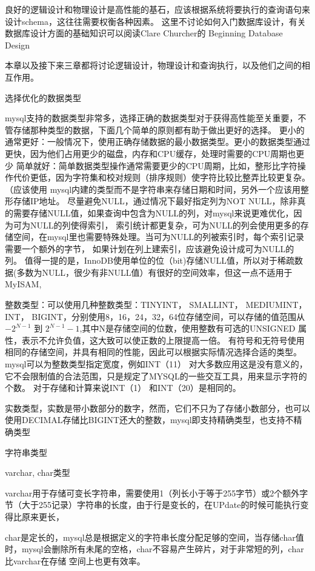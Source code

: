 
良好的逻辑设计和物理设计是高性能的基石，应该根据系统将要执行的查询语句来设计schema，这往往需要权衡各种因素。
这里不讨论如何入门数据库设计，有关数据库设计方面的基础知识可以阅读Clare Churcher的 Beginning Database Design

本章以及接下来三章都将讨论逻辑设计，物理设计和查询执行，以及他们之间的相互作用。

选择优化的数据类型

mysql支持的数据类型非常多，选择正确的数据类型对于获得高性能至关重要，不管存储那种类型的数据，下面几个简单的原则都有助于做出更好的选择。
更小的通常更好：一般情况下，使用正确存储数据的最小数据类型。更小的数据类型通过更快，因为他们占用更少的磁盘，内存和CPU缓存，处理时需要的CPU周期也更少
简单就好：简单数据类型操作通常需要更少的CPU周期，比如，整形比字符操作代价更低，因为字符集和校对规则（排序规则）使字符比较比整弄比较更复杂。（应该使用
mysql内建的类型而不是字符串来存储日期和时间，另外一个应该用整形存储IP地址。
尽量避免NULL，通过情况下最好指定列为NOT NULL，除非真的需要存储NULL值，如果查询中包含为NULL的列，对mysql来说更难优化，因为可为NULL的列使得索引，
索引统计都更复杂，可为NULL的列会使用更多的存储空间，在mysql里也需要特殊处理。当可为NULL的列被索引时，每个索引记录需要一个额外的字节，
如果计划在列上建索引，应该避免设计成可为NULL的列。
值得一提的是，InnoDB使用单位的位（bit)存储NULL值，所以对于稀疏数据(多数为NULL，很少有非NULL值）有很好的空间效率，但这一点不适用于MyISAM,

整数类型：可以使用几种整数类型：TINYINT， SMALLINT， MEDIUMINT， INT， BIGINT，分别使用8，16，24，32，64位存储空间，可以存储的值范围从$-2^{N-1}$ 到
$2^{N-1}-1$,其中N是存储空间的位数，使用整数有可选的UNSIGNED 属性，表示不允许负值，这大致可以使正数的上限提高一倍。
有符号和无符号使用相同的存储空间，并具有相同的性能，因此可以根据实际情况选择合适的类型。
mysql可以为整数类型指定宽度，例如INT（11） 对大多数应用这是没有意义的，它不会限制值的合法范围，只是规定了MYSQL的一些交互工具，用来显示字符的个数。
对于存储和计算来说INT（1） 和INT（20）是相同的。

实数类型，实数是带小数部分的数字，然而，它们不只为了存储小数部分，也可以使用DECIMAL存储比BIGINT还大的整数，mysql即支持精确类型，也支持不精确类型

字符串类型

varchar, char类型

varchar用于存储可变长字符串，需要使用1（列长小于等于255字节）或2个额外字节（大于255记录）字符串的长度，由于行是变长的，在UPdate的时候可能执行变得比原来更长，

char是定长的，mysql总是根据定义的字符串长度分配足够的空间，当存储char值时，mysql会删除所有未尾的空格，char不容易产生碎片，对于非常短的列，char比varchar在存储
空间上也更有效率。

